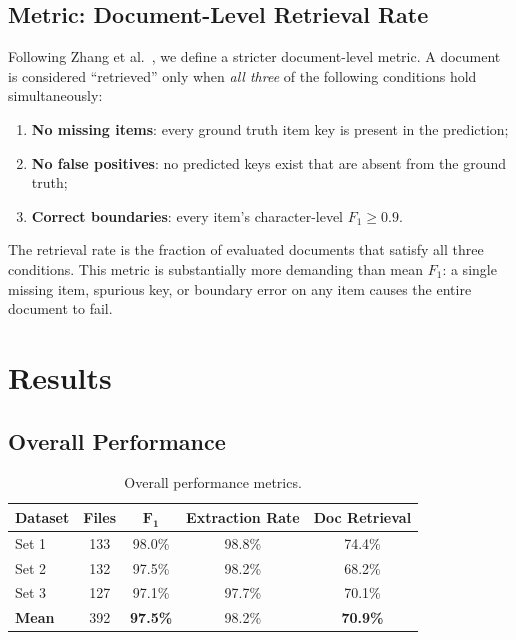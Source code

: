 \documentclass[12pt,letterpaper,oneside]{article}
\begin{document}
\subsection{Metric: Document-Level Retrieval Rate}

Following Zhang et al.~\cite{zhang2023form10k}, we define a stricter
document-level metric. A document is considered ``retrieved'' only
when \emph{all three} of the following conditions hold simultaneously:
\begin{enumerate}
  \item \textbf{No missing items}: every ground truth item key is
    present in the prediction;
  \item \textbf{No false positives}: no predicted keys exist that
    are absent from the ground truth;
  \item \textbf{Correct boundaries}: every item's character-level
    $F_1 \geq 0.9$.
\end{enumerate}
The retrieval rate is the fraction of evaluated documents that satisfy
all three conditions. This metric is substantially more demanding than
mean $F_1$: a single missing item, spurious key, or boundary error on
any item causes the entire document to fail.


\section{Results}\label{sec:results}

\subsection{Overall Performance}

\begin{table}[htbp]
\centering
\caption{Overall performance metrics.}\label{tab:results}
\begin{tabu}{lcccc}
\toprule
\textbf{Dataset} & \textbf{Files} & $\bm{F_1}$ & \textbf{Extraction Rate} & \textbf{Doc Retrieval} \\
\midrule
Set 1 & 133 & 98.0\% & 98.8\% & 74.4\% \\
Set 2 & 132 & 97.5\% & 98.2\% & 68.2\% \\
Set 3 & 127 & 97.1\% & 97.7\% & 70.1\% \\
\midrule
\textbf{Mean} & 392 & \textbf{97.5\%} & 98.2\% & \textbf{70.9\%} \\
\bottomrule
\end{tabu}
\end{table}
\end{document}
